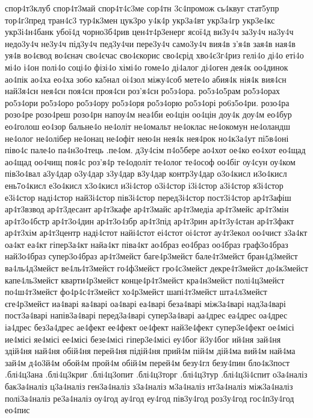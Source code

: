 {спор4т3клуб
спор4т3май
спор4т4с3ме
сор4тн
3с4промож
сь4квуг
стат5упр
тор4г3пред
тран4с3
тур4к3мен
цук3ро
у4к4р
укр3а4вт
укр3а4гр
укр3е4кс
укр3і4н4банк 
убої4д
чорно3б4рив
цен4т4р3енерг
ясої4д
ви3у4ч
за3у4ч
на3у4ч
недо3у4ч
не3у4ч
під3у4ч
пед3у4чи
пере3у4ч
само3у4ч
вия4в
з'я4в
зая4в
ная4в
уя4в
во4євод
во4єнач
сво4єчас
сво4єкорис
сво4єрід
хво4є3г4риз
гелі4о
ді4о
еті4о
мі4о
і4он
полі4о
соці4о
фізі4о
хімі4о
гоме4о
ді4алог
ді4оген
дея4к
оо4динок
ао4пік
ао4ха
ео4ха
зо6о
ка5нал
оі4зол
міжу4соб
мете4о
абия4к
нія4к
вия4сн
най3я4сн
нея4сн
поя4сн
проя4сн
роз'я4сн
ро5з4ора.    
ро5з4о5рам    
ро5з4орах    
ро5з4ори     
ро5з4оро     
ро5з4ору     
ро5з4оря     
ро5з4орю     
ро5з4орі     
ро6з5о4ри.   
розо4ра     
розо4ре      
розо4реш     
розо4рн
напоу4м
неа4би      
ео4цін
оо4цін
доу4к
доу4м
ео4бур
ео4голош
ео4зор
бальне4о
не4оліт
не4омальт
не4оклас
не4окомун
не4оландш
не4олог
не4олібер
не4онац
не4офіт
нею4н
нея4к
нея4рок 
но4к3а4ут 
пі5в4оні
піво4с
пале4о
па4н3о4тець
.пе4ом.
д3у4сім
п4о5бере
ао4хот
ое4ко
ео4хот
ео4щад
ао4щад
оо4чищ
поя4с
роз'я4р
те4одоліт
те4олог
те4ософ
оо4біг
оу4сун
оу4ком
пів3о4вал
а3у4дар
о3у4дар
з3у4дар
в3у4дар
контр3у4дар
о3о4кисл
и3о4кисл
ень7о4кисл
е3о4кисл
х3о4кисл
и3і4стор
о3і4стор
і3і4стор
а3і4стор
я3і4стор
е3і4стор
наді4стор
най3і4стор
пів3і4стор
перед3і4стор
пост3і4стор
ар4т3афіш
ар4т3взвод
ар4т3десант
ар4т3кафе
ар4т3майс
ар4т3медіа
ар4т3мейс
ар4т3мін
ар4т3о4бстр
ар4т3о4дин
ар4т3о4збр
ар4т3під
ар4т3рин
ар4т3у4стан
ар4т3факт
ар4т3хім
ар4т3центр
наді4стот
найі4стот
еі4стот
оі4стот
ау4т3екол
оо4чист
з3а4кт
оа4кт
еа4кт
гіпер3а4кт
найа4кт 
піва4кт
ао4браз
ео4браз
оо4браз
граф3о4браз
най3о4браз
супер3о4браз
ар4т3мейст
баге4р3мейст
бале4т3мейст
бран4д3мейст
ва4ль4д3мейст
ве4ль4т3мейст
го4ф3мейст
гро4с3мейст
декре4т3мейст
до4к3мейст
капе4ль3мейст
кварти4р3мейст
конце4р4т3мейст
кра4н3мейст
полі4ц3мейст
по4ш4т3мейст
фо4р4с4т3мейст
хо4р3мейст
шапі4т3мейст
шта4л3мейст
єге4р3мейст
иа4варі
яа4варі
оа4варі
еа4варі
беза4варі
між3а4варі
над3а4варі
пост3а4варі
напів3а4варі
перед3а4варі
супер3а4варі
аа4дрес
еа4дрес
оа4дрес
іа4дрес
без3а4дрес
ае4фект
ее4фект
ое4фект
най3е4фект
супер3е4фект
ое4місі
ие4місі
яе4місі
ее4місі
безе4місі
гіпер3е4місі
еу4бог
й3у4бог
ий4ня
зай4ня
здій4ня
най4ня
обій4ня
перей4ня
підій4ня
прий4м
пій4м
дій4ма
вий4м
най4ма
зай4м
д4о3й4м
обой4м
прой4м
обій4м
перей4м
безу4гл
безу4пин
бло4к3пост
.блі4ц3ана
.блі4ц3криг
.блі4ц3опит
.блі4ц3торг
.блі4ц3тур
.блі4ц3і4спит
о3а4наліз
бак3а4наліз
ц3а4наліз
ген3а4наліз
з3а4наліз
м3а4наліз
нт3а4наліз
між3а4наліз
полі3а4наліз
ре3а4наліз
оу4год
ау4год
еу4год
пів3у4год
роз3у4год
гос4п3у4год
ео4пис
}
